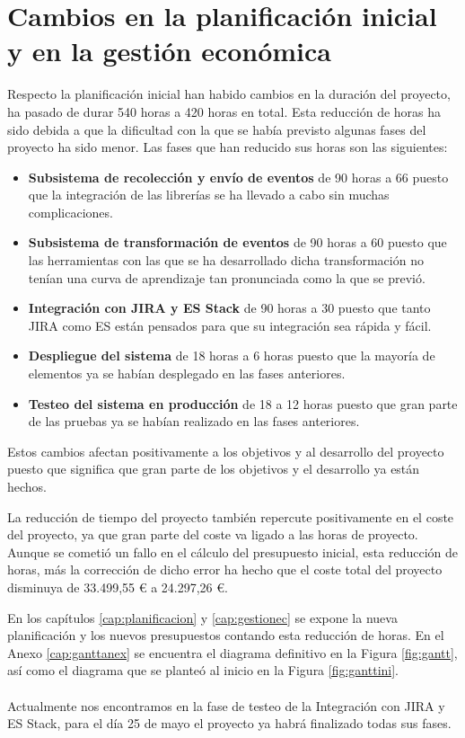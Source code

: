 \chapter{Cambios en la planificación inicial y en la gestión económica}

Respecto la planificación inicial han habido cambios en la duración del proyecto, ha pasado de durar 540 horas a 420 horas en total. Esta reducción de horas ha sido debida a que la dificultad con la que se había previsto algunas fases del proyecto ha sido menor. Las fases que han reducido sus horas son las siguientes:

\begin{itemize}
	\item \textbf{Subsistema de recolección y envío de eventos} de 90 horas a 66 puesto que la integración de las librerías se ha llevado a cabo sin muchas complicaciones.
	
	\item \textbf{Subsistema de transformación de eventos} de 90 horas a 60 puesto que las herramientas con las que se ha desarrollado dicha transformación no tenían una curva de aprendizaje tan pronunciada como la que se previó.
	
	\item \textbf{Integración con JIRA y ES Stack} de 90 horas a 30 puesto que tanto JIRA como ES están pensados para que su integración sea rápida y fácil.
	
	\item \textbf{Despliegue del sistema} de 18 horas a 6 horas puesto que la mayoría de elementos ya se habían desplegado en las fases anteriores.
	
	\item \textbf{Testeo del sistema en producción} de 18 a 12 horas puesto que gran parte de las pruebas ya se habían realizado en las fases anteriores.
\end{itemize}

Estos cambios afectan positivamente a los objetivos y al desarrollo del proyecto puesto que significa que gran parte de los objetivos y el desarrollo ya están hechos.

La reducción de tiempo del proyecto también repercute positivamente en el coste del proyecto, ya que gran parte del coste va ligado a las horas de proyecto. Aunque se cometió un fallo en el cálculo del presupuesto inicial, esta reducción de horas, más la corrección de dicho error ha hecho que el coste total del proyecto disminuya de 33.499,55 € a 24.297,26 €.

En los capítulos \ref{cap:planificacion} y \ref{cap:gestionec} se expone la nueva planificación y los nuevos presupuestos contando esta reducción de horas. En el Anexo \ref{cap:ganttanex} se encuentra el diagrama definitivo en la Figura \ref{fig:gantt}, así como el diagrama que se planteó al inicio en la Figura \ref{fig:ganttini}.
 \\ \\
Actualmente nos encontramos en la fase de testeo de la Integración con JIRA y ES Stack, para el día 25 de mayo el proyecto ya habrá finalizado todas sus fases.
